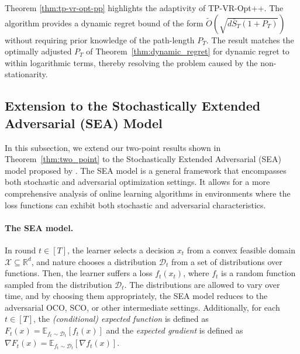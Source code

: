 \documentclass[journal,onecolumn]{IEEEtran}
\newcommand{\cD}{\mathcal{D}}
\newcommand{\cX}{\mathcal{X}}
\theoremstyle{plain}
\newtheorem{theorem}{Theorem}[section]
\theoremstyle{definition}
\theoremstyle{remark}
\newcommand{\regret}{\mathfrak{R}}
\newcommand{\tpvrplus}{{\sc TP-VR-Opt+}}
\newcommand{\tpvrplusplus}{{\sc TP-VR-Opt++}}
\begin{document}
Theorem \ref{thm:tp-vr-opt-pp} highlights the adaptivity of \tpvrplusplus. The algorithm provides a dynamic regret bound of the form
$\widetilde{O}(\sqrt{d \bar{S}_{T} (1+P_{T})})$ without requiring prior knowledge of
the path-length $P_{T}$. The result matches the optimally adjusted $P_T$ of Theorem~\ref{thm:dynamic_regret} for dynamic regret to within logarithmic terms, thereby resolving the problem caused by the non-stationarity.

\iffalse
\subsection{Extension to the Stochastically Extended Adversarial (SEA) Model}
\label{sec:sea}

In this subsection, we extend our two-point results shown in Theorem~\ref{thm:two_point}
to the Stochastically Extended Adversarial (SEA) model proposed by \citep{sachs2023accelerated}.
The SEA model is a general framework that encompasses both stochastic and
adversarial optimization settings. It allows for a more comprehensive analysis of
online learning algorithms in environments where the loss functions can exhibit both
stochastic and adversarial characteristics.

\paragraph{The SEA model.}
In round $t \in [T]$, the learner selects a decision $x_{t}$ from a convex feasible
domain $\cX \subseteq \mathbb{R}^{d}$, and nature chooses a distribution
$\cD_{t}$ from a set of distributions over functions. Then, the learner suffers
a loss $f_{t}(x_{t})$, where $f_{t}$ is a random function sampled from the distribution
$\cD_{t}$. The distributions are allowed to vary over time, and by choosing them
appropriately, the SEA model reduces to the adversarial OCO, SCO, or other
intermediate settings. Additionally, for each $t \in [T]$, the {\em (conditional) expected function}
is defined as $F_{t}(x) =\mathbb{E}_{f_t \sim \cD_t}[f_{t}(x)]$ and the {\em expected gradient}
is defined as $\nabla F_{t}(x) =\mathbb{E}_{f_t \sim \cD_t}[\nabla f_{t}(x)]$.
\end{document}
